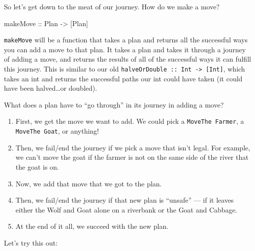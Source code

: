 \documentclass[]{article}
\newenvironment{Shaded}{}{}
\newcommand{\DataTypeTok}[1]{\textcolor[rgb]{0.56,0.13,0.00}{{#1}}}
\newcommand{\OtherTok}[1]{\textcolor[rgb]{0.00,0.44,0.13}{{#1}}}
\newcommand{\NormalTok}[1]{{#1}}
\begin{document}
So let's get down to the meat of our journey. How do we make a move?

\begin{Shaded}
\begin{Highlighting}[]
\OtherTok{makeMove ::} \DataTypeTok{Plan} \OtherTok{->} \NormalTok{[}\DataTypeTok{Plan}\NormalTok{]}
\end{Highlighting}
\end{Shaded}

\texttt{makeMove} will be a function that takes a plan and returns all
the successful ways you can add a move to that plan. It takes a plan and
takes it through a journey of adding a move, and returns the results of
all of the successful ways it can fulfill this journey. This is similar
to our old \texttt{halveOrDouble\ ::\ Int\ -\textgreater{}\ {[}Int{]}},
which takes an int and returns the successful paths our int could have
taken (it could have been halved\ldots{}or doubled).

What does a plan have to ``go through'' in its journey in adding a move?

\begin{enumerate}
\def\labelenumi{\arabic{enumi}.}
\tightlist
\item
  First, we get the move we want to add. We could pick a
  \texttt{MoveThe\ Farmer}, a \texttt{MoveThe\ Goat}, or anything!
\item
  Then, we fail/end the journey if we pick a move that isn't legal. For
  example, we can't move the goat if the farmer is not on the same side
  of the river that the goat is on.
\item
  Now, we add that move that we got to the plan.
\item
  Then, we fail/end the journey if that new plan is ``unsafe'' --- if it
  leaves either the Wolf and Goat alone on a riverbank or the Goat and
  Cabbage.
\item
  At the end of it all, we succeed with the new plan.
\end{enumerate}

Let's try this out:
\end{document}
